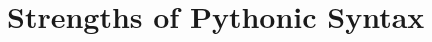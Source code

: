 \documentclass{l4proj}
\begin{document}

\section{Strengths of Pythonic Syntax}







\end{document}
